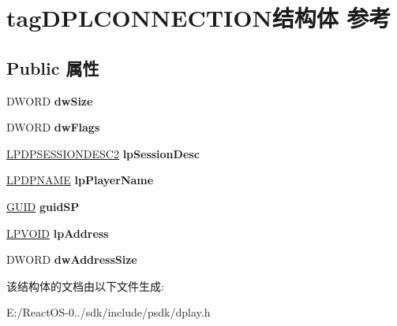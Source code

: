 \hypertarget{structtag_d_p_l_c_o_n_n_e_c_t_i_o_n}{}\section{tag\+D\+P\+L\+C\+O\+N\+N\+E\+C\+T\+I\+O\+N结构体 参考}
\label{structtag_d_p_l_c_o_n_n_e_c_t_i_o_n}
\subsection*{Public 属性}
\begin{DoxyCompactItemize}
\item 
\mbox{\label{structtag_d_p_l_c_o_n_n_e_c_t_i_o_n_a3ef91e5c874d62f02a801e785fbe9dbd}} 
D\+W\+O\+RD {\bfseries dw\+Size}
\item 
\mbox{\label{structtag_d_p_l_c_o_n_n_e_c_t_i_o_n_a2c64c344dc5fcaee54eb91a74176af04}} 
D\+W\+O\+RD {\bfseries dw\+Flags}
\item 
\mbox{\label{structtag_d_p_l_c_o_n_n_e_c_t_i_o_n_a2798be0c35fe214558a665dd84543157}} 
\hyperlink{structtag_d_p_s_e_s_s_i_o_n_d_e_s_c2}{L\+P\+D\+P\+S\+E\+S\+S\+I\+O\+N\+D\+E\+S\+C2} {\bfseries lp\+Session\+Desc}
\item 
\mbox{\label{structtag_d_p_l_c_o_n_n_e_c_t_i_o_n_aa3958380019dd39baa95a69cffa815e0}} 
\hyperlink{structtag_d_p_n_a_m_e}{L\+P\+D\+P\+N\+A\+ME} {\bfseries lp\+Player\+Name}
\item 
\mbox{\label{structtag_d_p_l_c_o_n_n_e_c_t_i_o_n_a79e2c2ff20006871fdf75eabb4eae921}} 
\hyperlink{interface_g_u_i_d}{G\+U\+ID} {\bfseries guid\+SP}
\item 
\mbox{\label{structtag_d_p_l_c_o_n_n_e_c_t_i_o_n_aed0d8328e2553f29994da03b081efae6}} 
\hyperlink{interfacevoid}{L\+P\+V\+O\+ID} {\bfseries lp\+Address}
\item 
\mbox{\label{structtag_d_p_l_c_o_n_n_e_c_t_i_o_n_a38d5773b252e15196f76c2501ded1036}} 
D\+W\+O\+RD {\bfseries dw\+Address\+Size}
\end{DoxyCompactItemize}


该结构体的文档由以下文件生成\+:\begin{DoxyCompactItemize}
\item 
E\+:/\+React\+O\+S-\/0../sdk/include/psdk/dplay.\+h\end{DoxyCompactItemize}
